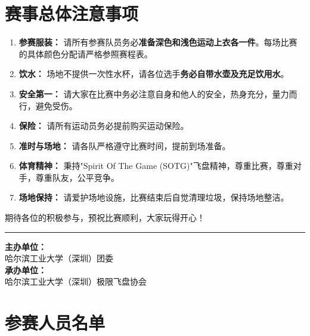 \documentclass{ctexart}
\begin{document}
\section{赛事总体注意事项}
\begin{enumerate}[label=\arabic*., itemsep=0.5em]
    \item \textbf{参赛服装：} 请所有参赛队员务必\textbf{准备深色和浅色运动上衣各一件}。每场比赛的具体颜色分配请严格参照赛程表。
    \item \textbf{饮水：} 场地不提供一次性水杯，请各位选手\textbf{务必自带水壶及充足饮用水}。
    \item \textbf{安全第一：} 请大家在比赛中务必注意自身和他人的安全，热身充分，量力而行，避免受伤。
    \item \textbf{保险：} 请所有运动员务必提前购买运动保险。
    \item \textbf{准时与场地：} 请各队严格遵守比赛时间，提前到场准备。
    \item \textbf{体育精神：} 秉持"Spirit Of The Game (SOTG)"飞盘精神，尊重比赛，尊重对手，尊重队友，公平竞争。
    \item \textbf{场地保持：} 请爱护场地设施，比赛结束后自觉清理垃圾，保持场地整洁。
\end{enumerate}

\vspace{1.5em}
\begin{center}
期待各位的积极参与，预祝比赛顺利，大家玩得开心！
\end{center}

\noindent\rule{\linewidth}{0.4pt}
\vspace{1em}

\begin{flushleft}
\textbf{主办单位：} \\
哈尔滨工业大学（深圳）团委 \\[1em]

\textbf{承办单位：} \\
哈尔滨工业大学（深圳）极限飞盘协会
\end{flushleft}

\newpage

\appendix
\section{参赛人员名单}
\end{document}
